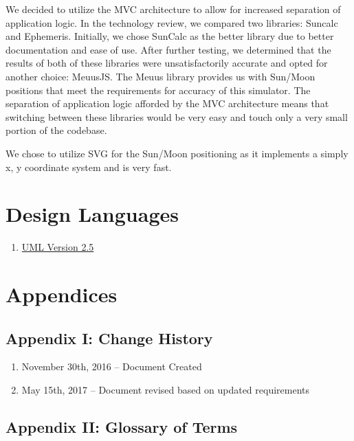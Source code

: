 \documentclass[10pt, onecolumn, draftclsnofoot, letterpaper, compsoc]{IEEEtran}
\begin{document}
We decided to utilize the MVC architecture to allow for increased
separation of application logic. In the technology review,
we compared two libraries: Suncalc and Ephemeris. Initially, we chose
SunCalc as the better library due to better documentation and ease of use. After
further testing, we determined that the results of both of these libraries were
unsatisfactorily accurate and opted for another choice: MeuusJS. The Meuus library
provides us with Sun/Moon positions that meet the requirements for accuracy of
this simulator. The separation of application logic afforded by the MVC architecture
means that switching between these libraries would be very easy and touch only a very
small portion of the codebase.

We chose to utilize SVG for the Sun/Moon positioning as it implements a simply x, y
coordinate system and is very fast. \\

\section{Design Languages}

\begin{enumerate}
    \item \href{http://www.omg.org/spec/UML/2.5}{UML Version 2.5}
\end{enumerate}


\newpage
\section{Appendices}

\subsection{Appendix I: Change History}

\begin{enumerate}
\item November 30th, 2016 -- Document Created
\item May 15th, 2017 -- Document revised based on updated requirements \\
\end{enumerate}

\subsection{Appendix II: Glossary of Terms}
\end{document}
